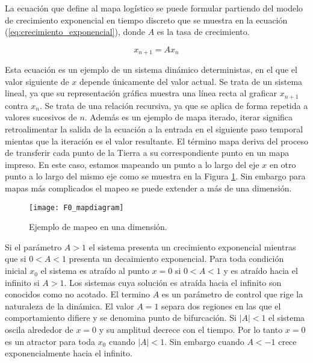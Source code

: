         La ecuación que define al mapa logístico se puede formular partiendo del modelo de crecimiento exponencial en tiempo discreto que se muestra en la ecuación (\ref{eq:crecimiento_exponencial}), donde $A$ es la tasa de crecimiento.

        \begin{equation}
            x_{n+1} = A x_{n}
            \label{eq:crecimiento_exponencial}
        \end{equation}

        Esta ecuación es un ejemplo de un sistema dinámico deterministas, en el que el valor siguiente de $x$ depende únicamente del valor actual. Se trata de un sistema lineal, ya que su representación gráfica muestra una línea recta al graficar $x_{n+1}$ contra $x_{n}$. Se trata de una relación recursiva, ya que se aplica de forma repetida a valores sucesivos de $n$. Además es un ejemplo de mapa iterado, iterar significa retroalimentar la salida de la ecuación a la entrada en el siguiente paso temporal mientas que la iteración es el valor resultante. El término mapa deriva del proceso de transferir cada punto de la Tierra a su correspondiente punto en un mapa impreso. En este caso, estamos mapeando un punto a lo largo del eje $x$ en otro punto a lo largo del mismo eje como se muestra en la Figura \ref{fig:F0_mapdiagram}. Sin embargo para mapas más complicados el mapeo se puede extender a más de una dimensión. 


        \begin{figure}[hbtp]
            \caption{Ejemplo de mapeo en una dimensión.}
            \centering
            \texttt{[image: F0\_mapdiagram]}
            \label{fig:F0_mapdiagram}
        \end{figure}


        Si el parámetro $A > 1$ el sistema presenta un crecimiento exponencial mientras que si $0 < A < 1$ presenta un decaimiento exponencial. Para toda condición inicial $x_{0}$ el sistema es atraído al punto $x = 0$ si $0 < A < 1$ y es atraído hacia el infinito si $A > 1$. Los sistemas cuya solución es atraída hacia el infinito son conocidos como no acotado. El termino $A$ es un parámetro de control que rige la naturaleza de la dinámica. El valor $A = 1$ separa dos regiones en las que el comportamiento difiere y se denomina punto de bifurcación. Si $|A| < 1$ el sistema oscila alrededor de $x = 0$ y su amplitud decrece con el tiempo. Por lo tanto $x = 0$ es un atractor para toda $x_{0}$ cuando $|A| < 1$. Sin embargo cuando $A< -1$ crece exponencialmente hacia el infinito.

